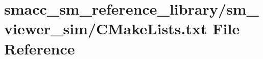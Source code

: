 \hypertarget{smacc__sm__reference__library_2sm__viewer__sim_2CMakeLists_8txt}{}\section{smacc\+\_\+sm\+\_\+reference\+\_\+library/sm\+\_\+viewer\+\_\+sim/\+C\+Make\+Lists.txt File Reference}
\label{smacc__sm__reference__library_2sm__viewer__sim_2CMakeLists_8txt}
